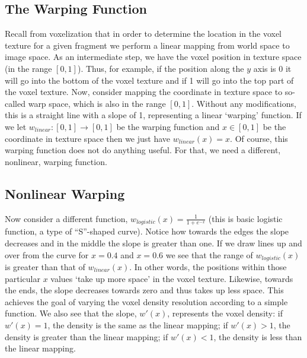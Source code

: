 \subsection{The Warping Function}
Recall from voxelization that in order to determine the location in the voxel texture for a given fragment we perform a linear mapping from world space to image space. As an intermediate step, we have the voxel position in texture space (in the range $[0, 1]$). Thus, for example, if the position along the $y$ axis is 0 it will go into the bottom of the voxel texture and if 1 will go into the top part of the voxel texture. Now, consider mapping the coordinate in texture space to so-called warp space, which is also in the range $[0, 1]$. Without any modifications, this is a straight line with a slope of 1, representing a linear `warping' function. If we let $w_{linear}: [0, 1] \rightarrow [0, 1]$ be the warping function and $x \in [0, 1]$ be the coordinate in texture space then we just have $w_{linear}(x) = x$. Of course, this warping function does not do anything useful. For that, we need a different, nonlinear, warping function.

\subsection{Nonlinear Warping}
Now consider a different function, $w_{logistic}(x) = \frac{1}{1 + e^{-x}}$ (this is basic logistic function, a type of ``S''-shaped curve). Notice how towards the edges the slope decreases and in the middle the slope is greater than one. If we draw lines up and over from the curve for $x = 0.4$ and $x = 0.6$ we see that the range of $w_{logistic}(x)$ is greater than that of $w_{linear}(x)$. In other words, the positions within those particular $x$ values `take up more space' in the voxel texture. Likewise, towards the ends, the slope decreases towards zero and thus takes up less space. This achieves the goal of varying the voxel density resolution according to a simple function. We also see that the slope, $w'(x)$, represents the voxel density: if $w'(x) = 1$, the density is the same as the linear mapping; if $w'(x) > 1$, the density is greater than the linear mapping; if $w'(x) < 1$, the density is less than the linear mapping.

